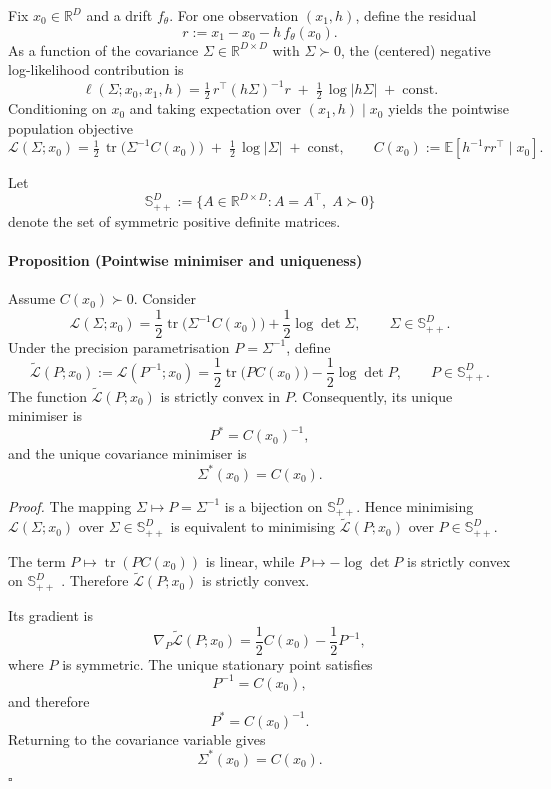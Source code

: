 \documentclass{article}
\newcommand{\E}{\mathbb{E}}
\DeclareMathOperator{\tr}{tr}
\def\R{\mathbb{R}}
\def\E{\mathbb{E}}
\begin{document}
Fix $x_0 \in \R^D$ and a drift $f_\theta$. For one observation $(x_1,h)$, define the residual
\[
r := x_1 - x_0 - h\,f_\theta(x_0).
\]
As a function of the covariance $\Sigma \in \R^{D\times D}$ with $\Sigma \succ 0$, the (centered) negative log-likelihood contribution is
\begin{equation}
\label{eq:diff_ll_single}
\ell(\Sigma; x_0, x_1, h)
= \tfrac{1}{2}\, r^\top (h \Sigma)^{-1} r \;+\; \tfrac{1}{2}\,\log|h \Sigma| \;+\; \mathrm{const}.
\end{equation}
Conditioning on $x_0$ and taking expectation over $(x_1,h)\mid x_0$ yields the pointwise population objective
\begin{equation}
\label{eq:diff_obj_pointwise}
\mathcal{L}(\Sigma; x_0)
= \tfrac{1}{2}\,\tr\!\big(\Sigma^{-1} C(x_0)\big) \;+\; \tfrac{1}{2}\,\log|\Sigma| \;+\; \mathrm{const},
\qquad
C(x_0) := \E\!\left[h^{-1} r r^\top \mid x_0\right].
\end{equation}



{\color{black}
Let
\[
\mathbb S_{++}^{D}
:=
\{A\in\mathbb R^{D\times D}:
A=A^\top,\;
A\succ0\}
\]
denote the set of symmetric positive definite matrices.

\paragraph{Proposition (Pointwise minimiser and uniqueness)}
Assume $C(x_0)\succ0$. Consider
\[
\mathcal{L}(\Sigma;x_0)
=
\frac12\tr\!\bigl(\Sigma^{-1}C(x_0)\bigr)
+
\frac12\log\det\Sigma,
\qquad
\Sigma\in\mathbb S_{++}^D.
\]
Under the precision parametrisation $P=\Sigma^{-1}$, define
\[
\widetilde{\mathcal L}(P;x_0)
:=
\mathcal L(P^{-1};x_0)
=
\frac12\tr\!\bigl(PC(x_0)\bigr)
-
\frac12\log\det P,
\qquad
P\in\mathbb S_{++}^D.
\]
The function $\widetilde{\mathcal L}(P;x_0)$ is strictly convex in
$P$. Consequently, its unique minimiser is
\[
P^*=C(x_0)^{-1},
\]
and the unique covariance minimiser is
\[
\Sigma^*(x_0)=C(x_0).
\]

\emph{Proof.}
The mapping $\Sigma\mapsto P=\Sigma^{-1}$ is a bijection on
$\mathbb S_{++}^D$. Hence minimising
$\mathcal L(\Sigma;x_0)$ over $\Sigma\in\mathbb S_{++}^D$
is equivalent to minimising
$\widetilde{\mathcal L}(P;x_0)$ over
$P\in\mathbb S_{++}^D$.

The term $P\mapsto\tr(PC(x_0))$ is linear, while
$P\mapsto-\log\det P$ is strictly convex on
$\mathbb S_{++}^D$
\citep{boyd2004convex}.
Therefore $\widetilde{\mathcal L}(P;x_0)$ is strictly convex.

Its gradient is
\[
\nabla_P\widetilde{\mathcal L}(P;x_0)
=
\frac12C(x_0)-\frac12P^{-1},
\]
where $P$ is symmetric. The unique stationary point satisfies
\[
P^{-1}=C(x_0),
\]
and therefore
\[
P^*=C(x_0)^{-1}.
\]
Returning to the covariance variable gives
\[
\Sigma^*(x_0)=C(x_0).
\]
\hfill$\square$
}
\end{document}
